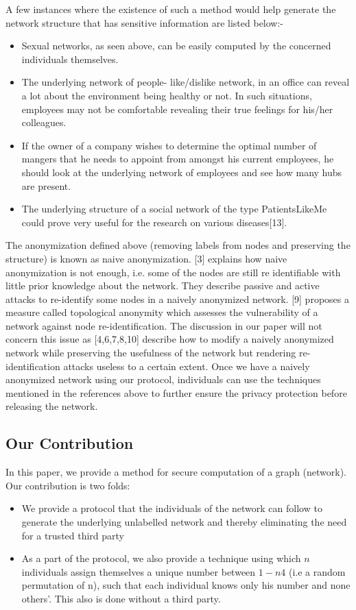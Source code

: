 \documentclass{llncs}
\begin{document}
A few instances where the existence of such a method would help generate the network structure that has sensitive information are listed below:-
\begin{itemize}
\item Sexual networks, as seen above, can be easily computed by the concerned individuals themselves.
\item The underlying network of people- like/dislike network, in an office can reveal a lot about the environment 
being healthy or not. In such situations, employees may not be comfortable revealing their true feelings for his/her 
colleagues. %
\item If the owner of a company wishes to determine the optimal number of mangers that he needs to appoint from 
amongst his current employees, he should look at the underlying network of employees and see how many hubs are present. 
\item The underlying structure of a social network of the type PatientsLikeMe could prove very useful for the research 
on various diseases[13].
\end{itemize}
The anonymization defined above (removing labels from nodes and preserving the structure) is known as naive 
anonymization. [3] explains how naive anonymization is not enough, i.e. some of the nodes are still re identifiable 
with little prior knowledge about the network. They describe passive and active attacks to re-identify some nodes in
a naively anonymized network. [9] proposes a measure called topological anonymity which assesses the vulnerability 
of a network against node re-identification. The discussion in our paper will not concern this issue as [4,6,7,8,10] describe how to modify a naively anonymized network while preserving the usefulness of the network but 
rendering re-identification attacks useless to a certain extent. Once we have a naively anonymized network using 
our protocol, individuals can use the techniques mentioned in the references above to further ensure the privacy 
protection before releasing the network.\\

\subsection{Our Contribution}
In this paper, we provide a method for secure computation 
of a graph (network). Our contribution is two folds:
\begin{itemize}
\item We provide a protocol that the individuals of the network can 
follow to generate the underlying unlabelled network and thereby eliminating the need for a trusted third party
\item As a part of the protocol, we also provide a technique using which $n$ individuals assign themselves a unique number 
between $1-n4$ (i.e a random permutation of n), such that each individual knows only his number and none others'. 
This also is done without a third party.
\end{itemize} 
\end{document}
